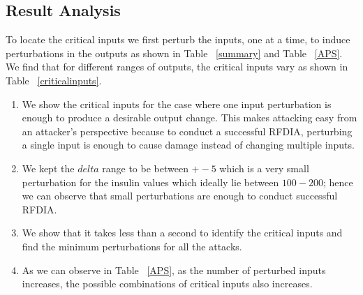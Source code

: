 \subsection{Result Analysis}
To locate the critical inputs we first perturb the inputs, one at a time, to induce perturbations in the outputs  as  shown in Table ~\ref{summary} and Table ~\ref{APS}. 
We find that for different ranges of outputs, the critical inputs vary as shown in Table ~\ref{criticalinputs}.         
\begin{enumerate}
	\item We show the critical inputs for the case where one input perturbation is enough to produce a desirable output change. 
	This makes attacking easy from an attacker's perspective because to conduct a successful \ac{RFDIA}, perturbing a single input is enough to cause damage instead of changing multiple inputs. 
	\item We kept the $delta$ range  to be between $+-5$ which is a very small perturbation for the insulin values which ideally lie between $100-200$; hence we can observe that small perturbations are enough to conduct successful \ac{RFDIA}.  
	\item  We show that it takes less than a second to identify the critical inputs and find the minimum perturbations for all the attacks.
	\item As we can observe in Table ~\ref{APS}, as the number of perturbed inputs increases, the possible combinations of critical inputs also increases. 
	
\end{enumerate}


 







